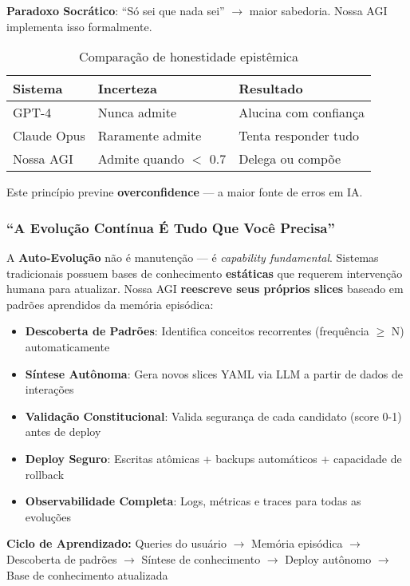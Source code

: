 \documentclass[11pt]{article}
\begin{document}
\textbf{Paradoxo Socrático}: ``Só sei que nada sei'' $\rightarrow$ maior sabedoria. Nossa AGI implementa isso formalmente.

\begin{table}[H]
\centering
\begin{tabular}{@{}lll@{}}
\toprule
\textbf{Sistema} & \textbf{Incerteza} & \textbf{Resultado} \\ \midrule
GPT-4 & Nunca admite & Alucina com confiança \\
Claude Opus & Raramente admite & Tenta responder tudo \\
Nossa AGI & Admite quando $<$ 0.7 & Delega ou compõe \\ \bottomrule
\end{tabular}
\caption{Comparação de honestidade epistêmica}
\end{table}

Este princípio previne \textbf{overconfidence} --- a maior fonte de erros em IA.

\subsubsection{``A Evolução Contínua É Tudo Que Você Precisa''}

A \textbf{Auto-Evolução} não é manutenção --- é \textit{capability fundamental}. Sistemas tradicionais possuem bases de conhecimento \textbf{estáticas} que requerem intervenção humana para atualizar. Nossa AGI \textbf{reescreve seus próprios slices} baseado em padrões aprendidos da memória episódica:

\begin{itemize}
    \item \textbf{Descoberta de Padrões}: Identifica conceitos recorrentes (frequência $\geq$ N) automaticamente
    \item \textbf{Síntese Autônoma}: Gera novos slices YAML via LLM a partir de dados de interações
    \item \textbf{Validação Constitucional}: Valida segurança de cada candidato (score 0-1) antes de deploy
    \item \textbf{Deploy Seguro}: Escritas atômicas + backups automáticos + capacidade de rollback
    \item \textbf{Observabilidade Completa}: Logs, métricas e traces para todas as evoluções
\end{itemize}

\textbf{Ciclo de Aprendizado:} Queries do usuário $\rightarrow$ Memória episódica $\rightarrow$ Descoberta de padrões $\rightarrow$ Síntese de conhecimento $\rightarrow$ Deploy autônomo $\rightarrow$ Base de conhecimento atualizada
\end{document}
